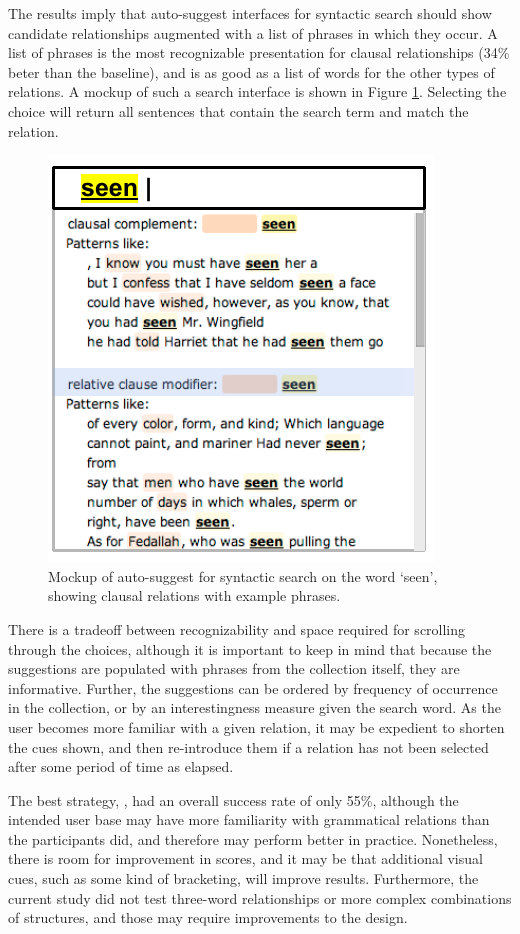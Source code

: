 

The results imply that auto-suggest interfaces for syntactic search should show candidate relationships augmented with a list of phrases in which they occur. A list of phrases is the most recognizable presentation for clausal relationships (34\% beter than the baseline), and is as good as a list of words for the other types of relations. A mockup of such a search interface is shown in Figure \ref{fig:phrases-mockup}.  Selecting the choice will return all sentences that contain the search term and match the relation.
\begin{figure}
\centering
\includegraphics[width=0.5\columnwidth]{fig/phrases-mockup}
\caption{
	\label{fig:phrases-mockup} Mockup of auto-suggest for syntactic search on the word `seen', showing clausal relations with example phrases.
}
\end{figure}

There is a tradeoff between recognizability and space required for scrolling through the choices, although it is important to keep in mind that because the suggestions are populated with phrases from the collection itself, they are informative.    Further, the suggestions can be ordered by frequency of occurrence in the collection, or by an interestingness measure given the search word.  As the user becomes more familiar with a given relation, it may  be expedient to shorten the cues shown, and then re-introduce them if a relation has not been selected after some period of time as elapsed.

The best  strategy, , had an overall success rate of only 55\%, although the intended user base may have more familiarity with grammatical relations than the participants did, and therefore may perform better in practice.  Nonetheless, there is room for improvement in scores, and it may be that additional visual cues, such as some kind of bracketing, will improve results.  Furthermore, the current study did not test three-word relationships or more complex combinations of structures, and those may require improvements to the design.
